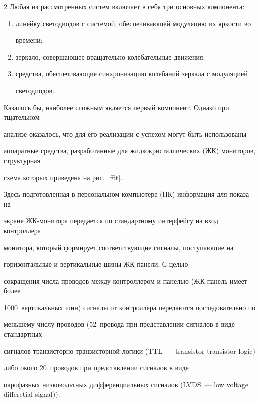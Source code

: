 \begin{multicols}{2}
  Любая из рассмотренных систем включает в себя три основных компонента:

\begin{enumerate}[(1)]

\item линейку светодиодов с системой, обеспечи\-ва\-ющей модуляцию их яркости во 

времени; 

\item зеркало, совершающее вращательно-ко\-ле\-ба\-тель\-ные движения; 

\item средства, обеспечивающие синхронизацию колебаний зеркала с модуляцией 

светодиодов.  

\end{enumerate}

  

  Казалось бы, наиболее сложным является первый компонент. Однако при тщательном 

анализе оказалось, что для его реализации с успехом могут быть использованы 

аппаратные средства, разработанные для жидкокристаллических (ЖК) мониторов, структурная 

схема которых приведена на рис.~\ref{f6t}. 

  

  Здесь подготовленная в персональном компьютере (ПК) информация для показа на 

экране ЖК-мо\-ни\-то\-ра передается по стандартному интерфейсу на вход контроллера 

монитора, который формирует соответствующие сигналы, поступающие на 

горизонтальные и вертикальные шины ЖК-панели. С целью 

сокращения числа проводов между контроллером и панелью (ЖК-па\-нель имеет более 

1000~вертикальных шин) сигналы от контроллера передаются последовательно по 

меньшему числу проводов (52~провода при представлении сигналов в виде стандартных 

сигналов транзисторно-транзисторной логики (TTL~--- transistor-transistor logic)

либо около 20~проводов при представлении сигналов в виде 

парофазных низковольтных дифференциальных сигналов (LVDS~--- low voltage differetial signal)). 


\end{multicols}
